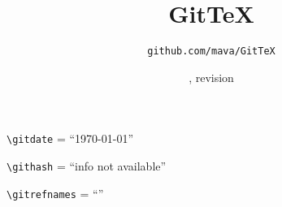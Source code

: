\documentclass{article}
\title{Git\TeX}
\author{\texttt{github.com/mava/GitTeX}}
\date{\small\gitdate, revision \githash\gitrefnames}
\providecommand*{\gitdate}{\today}
\providecommand*{\githash}{info not available}
\providecommand*{\gitrefnames}{}
\begin{document}
\maketitle
\thispagestyle{empty}

\verb+\gitdate+ = ``\gitdate''

\verb+\githash+ = ``\githash''

\verb+\gitrefnames+ = ``\gitrefnames''
\end{document}
